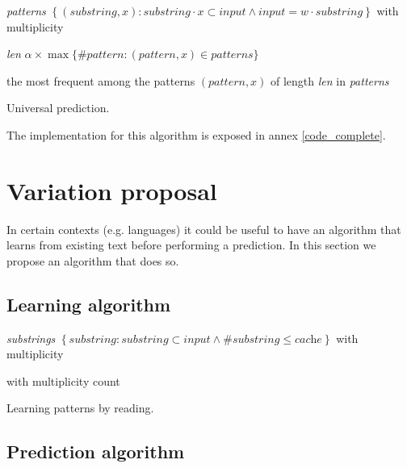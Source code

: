 \documentclass[a4paper,12pt]{article}
\begin{document}
    \begin{algorithm}

      \textit{patterns} \gets{}
        $\left\{ (\textit{substring},x) :%
        \textit{substring}\cdot x\subset\textit{input} \wedge
        \textit{input} = w\cdot\textit{substring} \right\}$
        with multiplicity\;

      \textit{len} \gets{} $\alpha\times\max\{\#\textit{pattern} :
        (\textit{pattern},x)\in\textit{patterns}\}$\;

       the most frequent among the patterns $(\textit{pattern},x)$
        of length \textit{len} in \textit{patterns}\;

      \caption{\label{complete}Universal prediction.}
    \end{algorithm}

    The implementation for this algorithm is exposed in annex \ref{code_complete}.

    \section{Variation proposal}\label{variation_algo}

    In certain contexts (e.g. languages) it could be useful to have an algorithm that learns from existing text  before performing a prediction. In this section we propose an algorithm that does so.
  
  \subsection{Learning algorithm}

  \begin{algorithm}

    \textit{substrings} \gets{}
      $\left\{ \textit{substring} : \textit{substring}\subset\textit{input}
      \wedge \#\textit{substring} \leq \textit{cache} \right\}$
      with multiplicity\;

     with multiplicity count\;

    \caption{\label{learning}Learning patterns by reading.}
  \end{algorithm}

  \subsection{Prediction algorithm}
\end{document}
